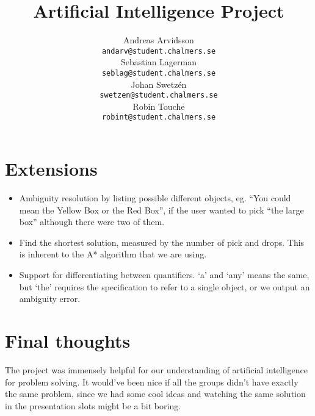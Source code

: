 \documentclass[11pt]{article}
\title{Artificial Intelligence Project}
\author{Andreas Arvidsson \\
  {\tt andarv@student.chalmers.se} \\
  Sebastian Lagerman \\
  {\tt seblag@student.chalmers.se} \\
  Johan Swetz\'{e}n \\
  {\tt swetzen@student.chalmers.se} \\
  Robin Touche \\
  {\tt robint@student.chalmers.se} \\}
\date{}
\begin{document}
\maketitle















\section*{Extensions}
\begin{itemize}
\item Ambiguity resolution by listing possible different objects, eg. ``You could mean the Yellow Box or the Red Box'', if the user wanted to pick ``the large box'' although there were two of them.
\item Find the shortest solution, measured by the number of pick and drops. This is inherent to the A* algorithm that we are using.
\item Support for differentiating between quantifiers. `a' and `any' means the same, but `the' requires the specification to refer to a single object, or we output an ambiguity error.
\end{itemize}

\section*{Final thoughts}
The project was immensely helpful for our understanding of artificial intelligence for problem solving. It would've been nice if all the groups didn't have exactly the same problem, since we had some cool ideas and watching the same solution in the presentation slots might be a bit boring.
\end{document}
